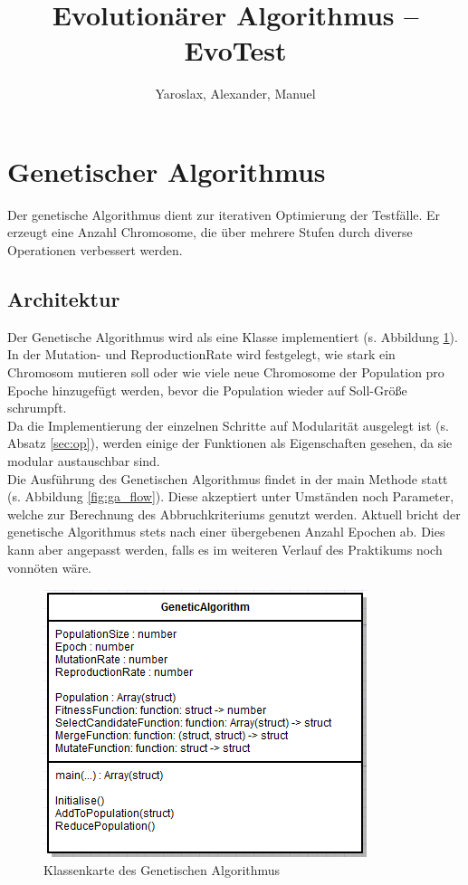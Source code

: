 \documentclass[12pt,a4paper]{scrartcl}
\title{Evolutionärer Algorithmus -- EvoTest}
\author{Yaroslax, Alexander, Manuel}
\begin{document}
\section{Genetischer Algorithmus}
Der genetische Algorithmus dient zur iterativen Optimierung der Testfälle. Er erzeugt eine Anzahl Chromosome, die über mehrere Stufen durch diverse Operationen verbessert werden.

\subsection{Architektur}
Der Genetische Algorithmus wird als eine Klasse implementiert (s. Abbildung \ref{fig:ga_uml}).\\
In der Mutation- und ReproductionRate wird festgelegt, wie stark ein Chromosom mutieren soll oder wie viele neue Chromosome der Population pro Epoche hinzugefügt werden, bevor die Population wieder auf Soll-Größe schrumpft.\\
Da die Implementierung der einzelnen Schritte auf Modularität ausgelegt ist (s. Absatz \ref{sec:op}), werden einige der Funktionen als Eigenschaften gesehen, da sie modular austauschbar sind.\\
Die Ausführung des Genetischen Algorithmus findet in der main Methode statt (s. Abbildung \ref{fig:ga_flow}). Diese akzeptiert unter Umständen noch Parameter, welche zur Berechnung des Abbruchkriteriums genutzt werden. Aktuell bricht der genetische Algorithmus stets nach einer übergebenen Anzahl Epochen ab. Dies kann aber angepasst werden, falls es im weiteren Verlauf des Praktikums noch vonnöten wäre.
\begin{figure}[H]
\centering
\includegraphics[width=.5\textwidth]{images/GA_UML}%
\caption{Klassenkarte des Genetischen Algorithmus}%
\label{fig:ga_uml}%
\end{figure}
\end{document}
